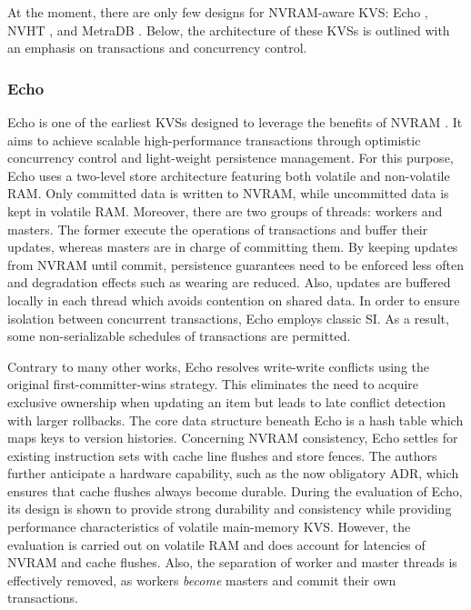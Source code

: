 At the moment, there are only few designs for \ac{NVRAM}-aware \ac{KVS}: Echo
\cite{bailey2013exploring}, NVHT \cite{zhou2016nvht}, and MetraDB
\cite{marmol2016nonvolatile}. Below, the architecture of these \acp{KVS} is
outlined with an emphasis on transactions and concurrency control.

\subsubsection{Echo}

Echo is one of the earliest \acp{KVS} designed to leverage the benefits of
\ac{NVRAM} \cite{bailey2013exploring}. It aims to achieve scalable
high-performance transactions through optimistic concurrency control and
light-weight persistence management. For this purpose, Echo uses a two-level
store architecture featuring both volatile and non-volatile \ac{RAM}. Only
committed data is written to \ac{NVRAM}, while uncommitted data is kept in
volatile \ac{RAM}. Moreover, there are two groups of threads: workers and
masters. The former execute the operations of transactions and buffer their
updates, whereas masters are in charge of committing them. By keeping updates
from \ac{NVRAM} until commit, persistence guarantees need to be enforced less
often and degradation effects such as wearing are reduced. Also, updates are
buffered locally in each thread which avoids contention on shared data. In order
to ensure isolation between concurrent transactions, Echo employs classic
\ac{SI}. As a result, some non-serializable schedules of transactions are
permitted.

Contrary to many other works, Echo resolves write-write conflicts
using the original first-committer-wins strategy. This eliminates the need to
acquire exclusive ownership when updating an item but leads to late conflict
detection with larger rollbacks. The core data structure beneath Echo is a hash
table which maps keys to version histories. Concerning \ac{NVRAM} consistency,
Echo settles for existing instruction sets with cache line flushes and store
fences. The authors further anticipate a hardware capability, such as the now
obligatory \ac{ADR}, which ensures that cache flushes always become durable.
During the evaluation of Echo, its design is shown to provide strong durability
and consistency while providing performance characteristics of volatile
main-memory \ac{KVS}. However, the evaluation is carried out on volatile
\ac{RAM} and does account for latencies of \ac{NVRAM} and cache flushes. Also,
the separation of worker and master threads is effectively removed, as workers
\emph{become} masters and commit their own transactions.

